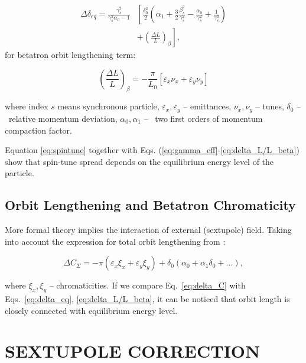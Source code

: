 \documentclass[a4paper,
               keeplastbox,   %
               ]{jacow}
\begin{document}
\begin{align}
\label{eq:delta_eq}
\Delta \delta_{e q}=\frac{\gamma_s^2}{\gamma_s^2 \alpha_0-1}&\left[\frac{\delta_0^2}{2}\left(\alpha_1+\frac{3}{2} \frac{\beta_s^2}{\gamma_s^2}-\frac{\alpha_0}{\gamma_s^2}+\frac{1}{\gamma_s^4}\right)\right.\nonumber\\
&+\left.\left(\frac{\Delta L}{L}\right)_\beta\right],
\end{align}
for betatron orbit lengthening term:

\begin{equation}\label{eq:delta_L/L_beta}
\left(\frac{\Delta L}{L}\right)_\beta=-\frac{\pi}{L_0}\left[\varepsilon_x \nu_x+\varepsilon_y \nu_y\right]
\end{equation}

\par where index $s$ means synchronous particle, $\varepsilon_x, \varepsilon_y$ – emittances, $\nu_x, \nu_y$ – tunes, $\delta_0$ – relative momentum deviation, $\alpha_0, \alpha_1$ –  two first orders of momentum compaction factor.

\par Equation \ref{eq:spintune} together with Eqs. (\ref{eq:gamma_eff}-\ref{eq:delta_L/L_beta}) show that spin-tune spread depends on the equilibrium energy level of the particle.

\subsection {Orbit Lengthening and Betatron Chromaticity}

\par More formal theory implies the interaction of external (sextupole) field. Taking into account the expression for total orbit lengthening from \cite{Lengthening}:

\begin{equation}\label{eq:delta_C}
\Delta C_{\Sigma}=- \pi\left(\varepsilon_x \xi_x+ \varepsilon_y \xi_y\right)+\delta_0\left(\alpha_0+\alpha_1 \delta_0+\ldots\right),
\end{equation}

\par where $\xi_x, \xi_y$ – chromaticities. If we compare Eq.~\ref{eq:delta_C} with Eqs.~\ref{eq:delta_eq}, \ref{eq:delta_L/L_beta}, it can be noticed that orbit length is closely connected with equilibrium energy level.

\section{SEXTUPOLE CORRECTION}
\end{document}
